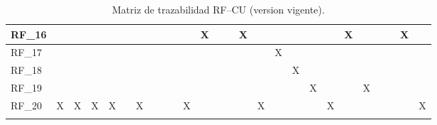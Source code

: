 \begin{landscape}
\begin{longtable}{|l|*{25}{c|}}
RF\_16 &  &  &  &  &  &  &  &  &  &  & X &  &  & X &  &  &  &  &  & X &  &  &  & X &  \\\hline
RF\_17 &  &  &  &  &  &  &  &  &  &  &  &  &  &  &  & X &  &  &  &  &  &  &  &  &  \\\hline
RF\_18 &  &  &  &  &  &  &  &  &  &  &  &  &  &  &  &  & X &  &  &  &  &  &  &  &  \\\hline
RF\_19 &  &  &  &  &  &  &  &  &  &  &  &  &  &  &  &  &  & X &  &  & X &  &  &  &  \\\hline
RF\_20 & X & X & X & X &  & X &  &  &  & X &  &  &  &  & X &  &  &  & X &  &  &  &  &  & X \\\hline
\caption{Matriz de trazabilidad RF--CU (version vigente).}
\label{tab:traza-grid}
\end{longtable}
\end{landscape}




